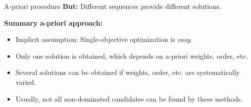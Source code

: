 \documentclass[11pt,compress,t,notes=noshow, xcolor=table]{beamer}
\begin{document}
\begin{vbframe}{A-priori procedure}
\textbf{But:} Different sequences provide different solutions.

\framebreak

\textbf{Summary a-priori approach:}
\vspace{0.5cm}
\begin{itemize}
\item Implicit assumption: Single-objective optimization is \emph{easy}.
\item Only one solution is obtained, which depends on a-priori weights, order, etc.
\item Several solutions can be obtained if weights, order, etc. are systematically varied.
\item Usually, not all non-dominated candidates can be found by these methods.
\end{itemize}

\end{vbframe}
\end{document}
